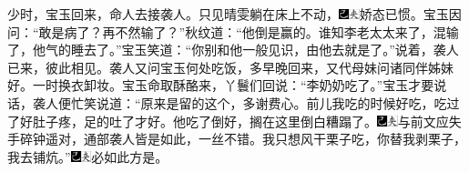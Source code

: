 少时，宝玉回来，命人去接袭人。只见晴雯躺在床上不动，{\includegraphics[width=3mm]{../Images/00003}\includegraphics[width=3mm]{../Images/00012}\footnotesize \kaishu 娇态已惯。}宝玉因问：``敢是病了？再不然输了？''秋纹道：``他倒是赢的。谁知李老太太来了，混输了，他气的睡去了。''宝玉笑道：``你别和他一般见识，由他去就是了。''说着，袭人已来，彼此相见。袭人又问宝玉何处吃饭，多早晚回来，又代母妹问诸同伴姊妹好。一时换衣卸妆。宝玉命取酥酪来，丫鬟们回说：``李奶奶吃了。''宝玉才要说话，袭人便忙笑说道：``原来是留的这个，多谢费心。前儿我吃的时候好吃，吃过了好肚子疼，足的吐了才好。他吃了倒好，搁在这里倒白糟蹋了。{\includegraphics[width=3mm]{../Images/00003}\includegraphics[width=3mm]{../Images/00012}\footnotesize \kaishu 与前文应失手碎钟遥对，通部袭人皆是如此，一丝不错。}我只想风干栗子吃，你替我剥栗子，我去铺炕。''{\includegraphics[width=3mm]{../Images/00003}\includegraphics[width=3mm]{../Images/00012}\footnotesize \kaishu 必如此方是。}

